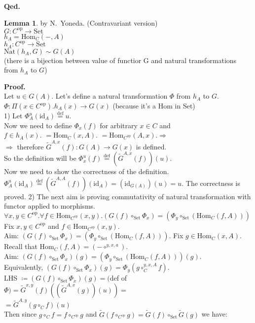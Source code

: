 \documentclass[10pt,a4paper]{article}
\theoremstyle{definition}
\newtheorem{lemma}{Lemma}[section]
\newcommand{\Hom}{{\mbox{Hom}}}
\newcommand{\Nat}{{\mbox{Nat}}}
\newcommand{\GMor}{{\widetilde{G}\mbox{}}}
\newcommand{\op}{{\mbox{op}}}
\newcommand{\id}{{\mbox{id}}}
\newcommand{\defi}{{\mbox{def}}}
\newcommand{\eqdef}{{\stackrel{\defi}{=}}}
\newcommand{\Set}{{\mbox{Set}}}
\newcommand{\myprf}{\noindent\textbf{Proof.}}
\newcommand{\myqed}{\noindent\textbf{Qed.}}
\begin{document}
\myqed
\begin{lemma}{by N.~Yoneda. (Contravariant version)}\\
$G : C^\op \to \Set$\\
$h_A = \Hom_C(-,A)$\\
$h_A : C^\op \to \Set$\\
$\Nat(h_A,G)\sim G(A)$\\
(there is a bijection between value of functior G and natural transformations from $h_A$ to $G$)
\end{lemma}
\myprf\\
Let $u\in G(A)$. Let's define a natural transformation $\Phi$ from $h_A$ to $G$.\\
$\Phi:\Pi(x\in C^\op).h_A(x)\to G(x)$ (because it's a Hom in Set)\\
1) Let $\Phi^u_A(\id_A)\eqdef u$. \\
Now we need to define $\Phi_x(f)$ for arbitrary $x\in C$ and\\
$f\in h_A(x).$ $=\Hom_C(x,A).$ $=\Hom_{C^\op}(A,x). \Longrightarrow$\\
$\Longrightarrow$ therefore $\GMor ^{A,x}(f):G(A)\to G(x)$ is defined.\\
So the definition will be $\Phi^u_x(f)\eqdef (\GMor^{A,x}(f))(u)$.\\
Now we need to show the correctness of the definition.\\
$\Phi^u_A(\id_A)\eqdef (\GMor^{A,A}(f))(\id_A) = (\id_{G(A)})(u) = u$. The correctness is proved.
2) The next aim is proving commutativity of natural transformation with functor applied to morphisms.\\
$\forall x,y\in C^\op.\forall f\in \Hom_{C^\op}(x,y).(G(f)\circ_\Set \Phi_x) = (\Phi_y \circ_\Set (\Hom_C(f,A)))$
Fix  $x,y\in C^\op$ and $f\in \Hom_{C^\op}(x,y)$.\\
Aim: $(G(f)\circ_\Set \Phi_x) = (\Phi_y \circ_\Set (\Hom_C(f,A)))$.
Fix $g\in \Hom_C(x,A)$. Recall that $\Hom_C(f,A)=(-\circ^{y,x,a})$.\\
Aim: $(G(f)\circ_\Set \Phi_x)(g) = (\Phi_y \circ_\Set (\Hom_C(f,A)))(g)$.\\
Equivalently, $(G(f)\circ_\Set \Phi_x)(g) = \Phi_y (g\circ_C^{y,x,A} f)$.\\
LHS $\coloneqq (G(f)\circ_\Set \Phi_x)(g) =($def of $\Phi)= \GMor^{x,y}(f)\left(\left(\GMor^{A,x}\left(g\right)\right)\left(u\right)\right) =$\\
$ =\GMor^{A,y}\left(g\circ_C f\right)(u)$\\
Then since $g\circ_C f = f\circ_{C^\op} g$ and $\GMor(f\circ_{C^\op} g)=  \GMor(f)\circ_\Set \GMor(g)$ we have:\\
\end{document}
